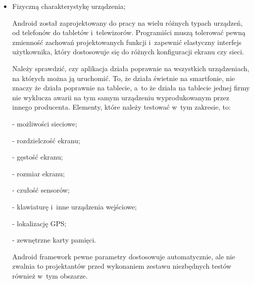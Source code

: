 \begin{itemize}
Według dokumentacji Android \cite{website:android:manual} możliwe są następujące opcje przechowywania danych:

- \textit{Shared Preferences}, czyli zachowywanie podstawowych danych w~parach klucz - wartość;

- pamięć wewnętrzna urządzenia - do zachowywania danych niepublicznych;

- zewnętrzna karta pamięci - do zachowywania danych publicznych;

- baza danych SQLite - do przechowywania danych w~prywatnej bazie danych;

- zasoby sieciowe - jako baza danych współdzielona pomiędzy urządzeniami.

Wszystkie te opcje korzystają ze wspólnego zestawu funkcji\footnote{Na przykład do obsługi plików używa się \textit{getFileDir(), getDir(), deleteFile()} itp.}, które tester powinien wziąć pod uwagę przy tworzeniu przypadków testowych.

\item{Fizyczną charakterystykę urządzenia;}

Android został zaprojektowany do pracy na wielu różnych typach urządzeń, od telefonów do tabletów i~telewizorów. Programiści muszą tolerować pewną zmienność zachowań projektowanych funkcji i~zapewnić elastyczny interfejs użytkownika, który dostosowuje się do różnych konfiguracji ekranu czy sieci.

Należy sprawdzić, czy aplikacja działa poprawnie na wszystkich urządzeniach, na których można ją uruchomić. To, że działa świetnie na smartfonie, nie znaczy że działa poprawnie na tablecie, a~to że działa na tablecie jednej firmy nie wyklucza awarii na tym samym urządzeniu wyprodukowanym przez innego producenta. Elementy, które należy testować w~tym zakresie, to:

- możliwości sieciowe;

- rozdzielczość ekranu;

- gęstość ekranu;

- rozmiar ekranu;

- czułość sensorów;

- klawiaturę i~inne urządzenia wejściowe;

- lokalizację GPS;

- zewnętrzne karty pamięci.

Android framework pewne parametry dostosowuje automatycznie, ale nie zwalnia to projektantów przed wykonaniem zestawu niezbędnych testów również w~tym obszarze.

\end{itemize}

